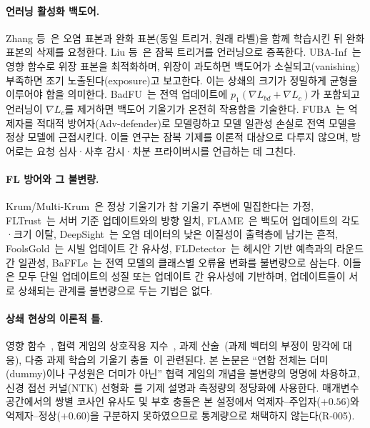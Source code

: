 \documentclass[10pt,a4paper]{article}
\begin{document}
\paragraph{언러닝 활성화 백도어.} Zhang 등~\cite{zhang2023}은 오염 표본과 완화 표본(동일 트리거, 원래 라벨)을 함께 학습시킨 뒤 완화 표본의 삭제를 요청한다. Liu 등~\cite{liu2024}은 잠복 트리거를 언러닝으로 증폭한다. UBA-Inf~\cite{ubainf}는 영향 함수로 위장 표본을 최적화하며, 위장이 과도하면 백도어가 소실되고(vanishing) 부족하면 조기 노출된다(exposure)고 보고한다. 이는 상쇄의 크기가 정밀하게 균형을 이루어야 함을 의미한다. BadFU~\cite{badfu}는 전역 업데이트에 $p_1(\nabla L_{bd}+\nabla L_c)$가 포함되고 언러닝이 $\nabla L_c$를 제거하면 백도어 기울기가 온전히 작용함을 기술한다. FUBA~\cite{fuba}는 억제자를 적대적 방어자(Adv-defender)로 모델링하고 모델 일관성 손실로 전역 모델을 정상 모델에 근접시킨다. 이들 연구는 잠복 기제를 이론적 대상으로 다루지 않으며, 방어로는 요청 심사·사후 감시·차분 프라이버시를 언급하는 데 그친다.

\paragraph{FL 방어와 그 불변량.} Krum/Multi-Krum~\cite{krum}은 정상 기울기가 참 기울기 주변에 밀집한다는 가정, FLTrust~\cite{fltrust}는 서버 기준 업데이트와의 방향 일치, FLAME~\cite{flame}은 백도어 업데이트의 각도·크기 이탈, DeepSight~\cite{deepsight}는 오염 데이터의 낮은 이질성이 출력층에 남기는 흔적, FoolsGold~\cite{foolsgold}는 시빌 업데이트 간 유사성, FLDetector~\cite{fldetector}는 헤시안 기반 예측과의 라운드 간 일관성, BaFFLe~\cite{baffle}는 전역 모델의 클래스별 오류율 변화를 불변량으로 삼는다. 이들은 모두 단일 업데이트의 성질 또는 업데이트 간 유사성에 기반하며, 업데이트들이 서로 상쇄되는 관계를 불변량으로 두는 기법은 없다.

\paragraph{상쇄 현상의 이론적 틀.} 영향 함수~\cite{koh2017}, 협력 게임의 상호작용 지수~\cite{grabisch}, 과제 산술~\cite{ilharco}(과제 벡터의 부정이 망각에 대응), 다중 과제 학습의 기울기 충돌~\cite{pcgrad}이 관련된다. 본 논문은 ``연합 전체는 더미(dummy)이나 구성원은 더미가 아닌'' 협력 게임의 개념을 불변량의 명명에 차용하고, 신경 접선 커널(NTK) 선형화~\cite{hayase2022}를 기제 설명과 측정량의 정당화에 사용한다. 매개변수 공간에서의 쌍별 코사인 유사도 및 부호 충돌은 본 설정에서 억제자--주입자($+0.56$)와 억제자--정상($+0.60$)을 구분하지 못하였으므로 통계량으로 채택하지 않는다(R-005).
\end{document}
